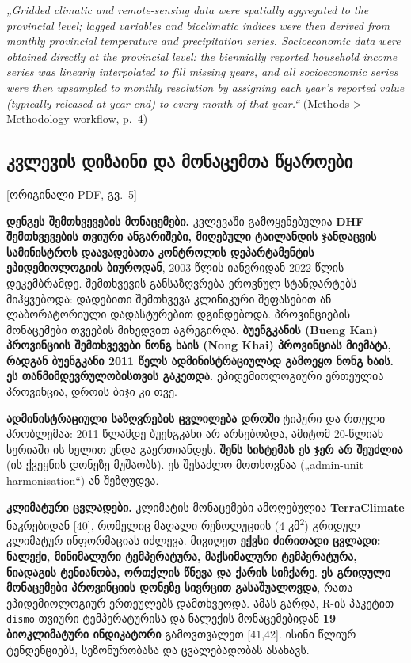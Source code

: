 \documentclass[11pt,a4paper]{article}
\newcommand{\imp}[1]{\textbf{\color{importred}#1}}
\newcommand{\pg}[1]{{\small\color{gray}[ორიგინალი PDF, გვ.~#1]}}
\begin{document}
\begin{citat}
\textit{„Gridded climatic and remote-sensing data were spatially aggregated to the provincial level; lagged variables and bioclimatic indices were then derived from monthly provincial temperature and precipitation series. Socioeconomic data were obtained directly at the provincial level: the biennially reported household income series was linearly interpolated to fill missing years, and all socioeconomic series were then upsampled to monthly resolution by assigning each year's reported value (typically released at year-end) to every month of that year.“} (Methods > Methodology workflow, p.~4)
\end{citat}

\subsection*{კვლევის დიზაინი და მონაცემთა წყაროები} \pg{5}

\textbf{დენგეს შემთხვევების მონაცემები.} კვლევაში გამოყენებულია \imp{DHF შემთხვევების თვიური ანგარიშები,
მიღებული ტაილანდის ჯანდაცვის სამინისტროს დაავადებათა კონტროლის დეპარტამენტის ეპიდემიოლოგიის ბიუროდან},
2003 წლის იანვრიდან 2022 წლის დეკემბრამდე. შემთხვევის განსაზღვრება ეროვნულ სტანდარტებს მიჰყვებოდა:
დადებითი შემთხვევა კლინიკური შეფასებით ან ლაბორატორიული დადასტურებით დგინდებოდა. პროვინციების მონაცემები
თვეების მიხედვით აგრეგირდა. \imp{ბუენგკანის (Bueng Kan) პროვინციის შემთხვევები ნონგ ხაის (Nong Khai)
პროვინციას მიემატა, რადგან ბუენგკანი 2011 წელს ადმინისტრაციულად გამოეყო ნონგ ხაის. ეს თანმიმდევრულობისთვის
გაკეთდა.} ეპიდემიოლოგიური ერთეულია პროვინცია, დროის ბიჯი კი თვე.

\begin{etl}
\textbf{ადმინისტრაციული საზღვრების ცვლილება დროში} ტიპური და რთული პრობლემაა: 2011 წლამდე ბუენგკანი
არ არსებობდა, ამიტომ 20-წლიან სერიაში ის ხელით უნდა გაერთიანდეს. \imp{შენს სისტემას ეს ჯერ არ შეუძლია}
(ის ქვეყნის დონეზე მუშაობს). ეს შესაძლო მოთხოვნაა („admin-unit harmonisation“) ან შეზღუდვა.
\end{etl}

\textbf{კლიმატური ცვლადები.} კლიმატის მონაცემები ამოღებულია \imp{TerraClimate} ნაკრებიდან [40], რომელიც
მაღალი რეზოლუციის (4 კმ\textsuperscript{2}) გრიდულ კლიმატურ ინფორმაციას იძლევა. მივიღეთ
\imp{ექვსი ძირითადი ცვლადი: ნალექი, მინიმალური ტემპერატურა, მაქსიმალური ტემპერატურა, ნიადაგის ტენიანობა,
ორთქლის წნევა და ქარის სიჩქარე}. \imp{ეს გრიდული მონაცემები პროვინციის დონეზე სივრცით გასაშუალოვდა},
რათა ეპიდემიოლოგიურ ერთეულებს დამთხვეოდა. ამას გარდა, R-ის პაკეტით \texttt{dismo} თვიური ტემპერატურისა და
ნალექის მონაცემებიდან \imp{19 ბიოკლიმატური ინდიკატორი} გამოვთვალეთ [41,42]. ისინი წლიურ ტენდენციებს,
სეზონურობასა და ცვალებადობას ასახავს.
\end{document}
